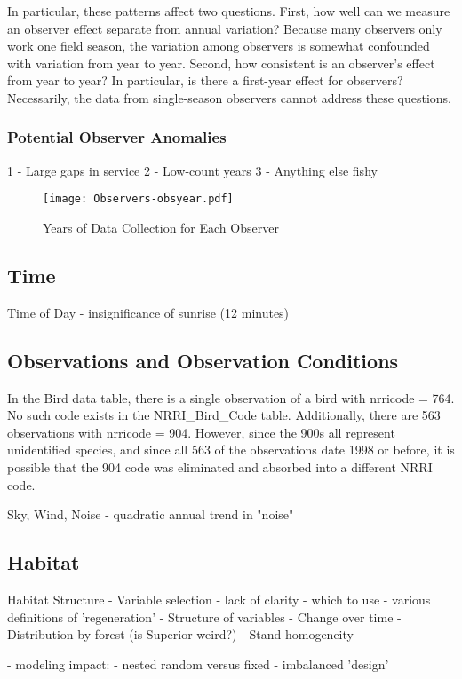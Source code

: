 

In particular, these patterns affect two questions.  First, how well can we measure an observer effect separate from annual variation?  Because many observers only work one field season, the variation among observers is somewhat confounded with variation from year to year.  Second, how consistent is an observer's effect from year to year?  In particular, is there a first-year effect for observers?  Necessarily, the data from single-season observers cannot address these questions.

\subsubsection{Potential Observer Anomalies}

1 - Large gaps in service
2 - Low-count years
3 - Anything else fishy

\begin{figure}
\texttt{[image: Observers-obsyear.pdf]}
\caption{Years of Data Collection for Each Observer}
\label{fig:Observers-obsyear}
\end{figure}





\subsection{Time}

Time of Day
- insignificance of sunrise (12 minutes)





\subsection{Observations and Observation Conditions}

In the Bird data table, there is a single observation of a bird with nrricode = 764.  No such code exists in the NRRI_Bird_Code table.  Additionally, there are 563 observations with nrricode = 904.  However, since the 900s all represent unidentified species, and since all 563 of the observations date 1998 or before, it is possible that the 904 code was eliminated and absorbed into a different NRRI code.


Sky, Wind, Noise
- quadratic annual trend in "noise"





\subsection{Habitat}

Habitat Structure
- Variable selection
  - lack of clarity
    - which to use
    - various definitions of 'regeneration'
- Structure of variables
- Change over time
- Distribution by forest (is Superior weird?)
- Stand homogeneity

- modeling impact:
  - nested random versus fixed
  - imbalanced 'design'